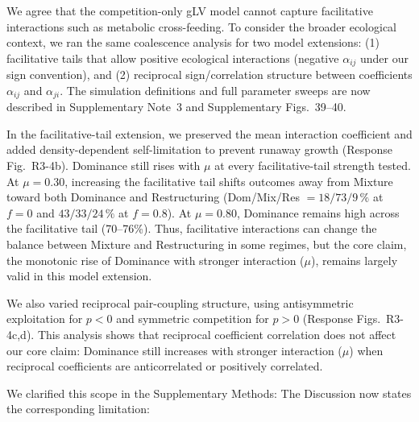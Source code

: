 We agree that the competition-only gLV model cannot capture facilitative interactions such as metabolic cross-feeding. To consider the broader ecological context, we ran the same coalescence analysis for two model extensions: (1) facilitative tails that allow positive ecological interactions (negative $\alpha_{ij}$ under our sign convention), and (2) reciprocal sign/correlation structure between coefficients $\alpha_{ij}$ and $\alpha_{ji}$. The simulation definitions and full parameter sweeps are now described in Supplementary Note~3 and Supplementary Figs.~39--40.

In the facilitative-tail extension, we preserved the mean interaction coefficient and added density-dependent self-limitation to prevent runaway growth (Response Fig.~R3-4b). Dominance still rises with $\mu$ at every facilitative-tail strength tested. At $\mu=0.30$, increasing the facilitative tail shifts outcomes away from Mixture toward both Dominance and Restructuring (Dom/Mix/Res $=18/73/9\,\%$ at $f=0$ and $43/33/24\,\%$ at $f=0.8$). At $\mu=0.80$, Dominance remains high across the facilitative tail (70--76\%). Thus, facilitative interactions can change the balance between Mixture and Restructuring in some regimes, but the core claim, the monotonic rise of Dominance with stronger interaction ($\mu$), remains largely valid in this model extension.

We also varied reciprocal pair-coupling structure, using antisymmetric exploitation for $p<0$ and symmetric competition for $p>0$ (Response Figs.~R3-4c,d). This analysis shows that reciprocal coefficient correlation does not affect our core claim: Dominance still increases with stronger interaction ($\mu$) when reciprocal coefficients are anticorrelated or positively correlated.

We clarified this scope in the Supplementary Methods:  The Discussion now states the corresponding limitation: 

